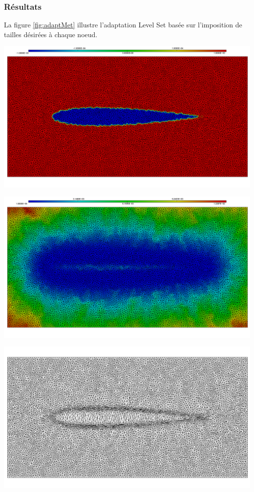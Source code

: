 \subsubsection{Résultats}

\indent La figure \ref{fig:adaptMet} illustre l'adaptation Level Set basée sur l'imposition de tailles désirées à chaque noeud.

\begingroup
	\begin{minipage}[t]{.5\linewidth}
		\centering
		\includegraphics[scale=.15]{Bordeaux/figures/metLSNacaLS.png}
	\end{minipage}
	\hfill
	\begin{minipage}[t]{.5\linewidth}
		\centering
		\includegraphics[scale=.15]{Bordeaux/figures/metLSNacaMet.png}
	\end{minipage}	
	\begin{minipage}[t]{1.\linewidth}
		\centering
		\includegraphics[scale=.2]{Bordeaux/figures/metLSNacaAdapt.png}
	\end{minipage}	
